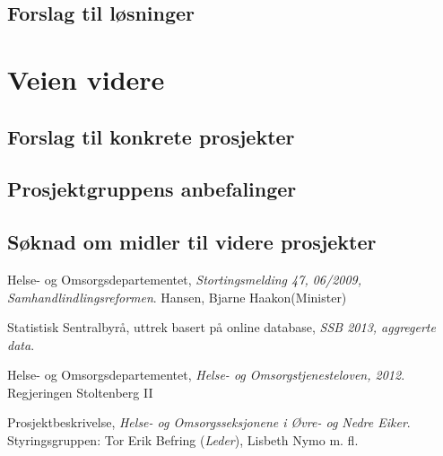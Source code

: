 \documentclass[11pt]{report} %
\begin{document}
  \section{Forslag til løsninger}\label{chap:disk_losn}

\chapter{Veien videre}\label{chap:vvidere}
  \section{Forslag til konkrete prosjekter}\label{chap:vvidere_konkpr}
  \section{Prosjektgruppens anbefalinger}\label{chap:vvidere_anbef}
  \section{Søknad om midler til videre prosjekter}\label{chap:vvidere_soknmid}


\renewcommand{\bibname}{Kilder:}
\begin{thebibliography}{9}

    Helse- og Omsorgsdepartementet,
    \emph{Stortingsmelding 47, 06/2009, Samhandlindlingsreformen}.
    Hansen, Bjarne Haakon(Minister)

    Statistisk Sentralbyrå, uttrek basert på online database,
    \emph{SSB 2013, aggregerte data}.

    Helse- og Omsorgsdepartementet,
    \emph{Helse- og Omsorgstjenesteloven, 2012}.
    Regjeringen Stoltenberg II

    Prosjektbeskrivelse,
    \emph{Helse- og Omsorgsseksjonene i Øvre- og Nedre Eiker}.
    Styringsgruppen: Tor Erik Befring (\emph{Leder}), Lisbeth Nymo m. fl.


\end{thebibliography}

\listoffigures
\listoftables
\end{document}
